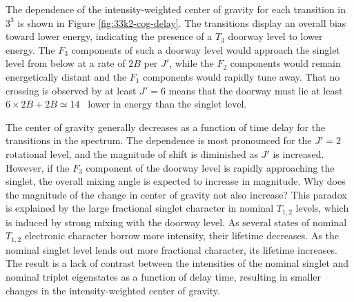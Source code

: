 The dependence of the intensity-weighted center of gravity for each
transition in $3^3$  is shown in Figure
\ref{fig:33k2-cog-delay}.  The transitions display an overall bias
toward lower energy, indicating the presence of a $T_3$ doorway level
to lower energy.  The $F_3$ components of such a doorway level would
approach the singlet level from below at a rate of $2B$ per $J'$,
while the $F_2$ components would remain energetically distant and the
$F_1$ components would rapidly tune away.  That no crossing is
observed by at least $J'=6$ means that the doorway must lie at least
$6\times2B + 2B \simeq 14$ \rcm\ lower in energy than the singlet
level.

The center of gravity generally decreases as a function of time delay
for the transitions in the spectrum.  The dependence is most
pronounced for the $J'=2$ rotational level, and the magnitude of shift
is diminished as $J'$ is increased.  However, if the $F_3$ component
of the doorway level is rapidly approaching the singlet, the overall
mixing angle is expected to increase in magnitude.  Why does the
magnitude of the change in center of gravity not also increase?  This
paradox is explained by the large fractional singlet character in
nominal $T_{1,2}$ levels, which is induced by strong mixing with the
doorway level.  As several states of nominal $T_{1,2}$ electronic
character borrow more intensity, their lifetime decreases.  As the
nominal singlet level lends out more fractional character, its
lifetime increases.  The result is a lack of contrast between the
intensities of the nominal singlet and nominal triplet eigenstates as
a function of delay time, resulting in smaller changes in the
intensity-weighted center of gravity.




